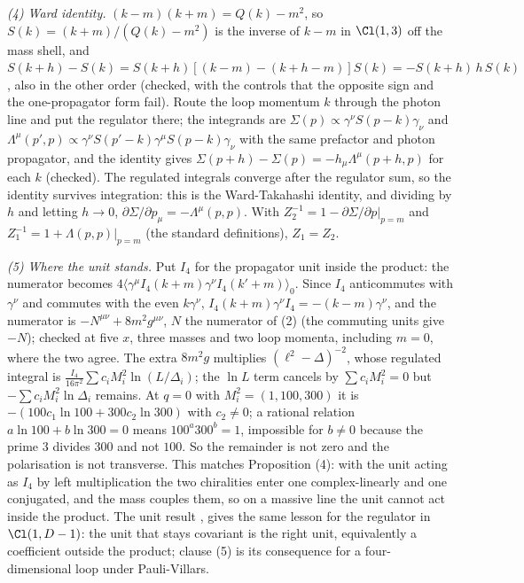 \emph{(4) Ward identity.} $(k - m)(k + m) = Q(k) - m^{2}$, so $S(k) = (k + m)/(Q(k) - m^{2})$ is the inverse of $k - m$ in $\Cl(1,3)$ off the mass shell, and $S(k+h) - S(k) = S(k+h)[(k - m) - (k + h - m)]S(k) = -S(k+h)\,h\,S(k)$, also in the other order (checked, with the controls that the opposite sign and the one-propagator form fail). Route the loop momentum $k$ through the photon line and put the regulator there; the integrands are $\Sigma(p) \propto \gamma^{\nu}S(p-k)\gamma_{\nu}$ and $\Lambda^{\mu}(p', p) \propto \gamma^{\nu}S(p'-k)\gamma^{\mu}S(p-k)\gamma_{\nu}$ with the same prefactor and photon propagator, and the identity gives $\Sigma(p+h) - \Sigma(p) = -h_{\mu}\Lambda^{\mu}(p+h, p)$ for each $k$ (checked). The regulated integrals converge after the regulator sum, so the identity survives integration: this is the Ward-Takahashi identity, and dividing by $h$ and letting $h \to 0$, $\partial\Sigma/\partial p_{\mu} = -\Lambda^{\mu}(p, p)$. With $Z_{2}^{-1} = 1 - \partial\Sigma/\partial p|_{p = m}$ and $Z_{1}^{-1} = 1 + \Lambda(p, p)|_{p = m}$ (the standard definitions), $Z_{1} = Z_{2}$.

\emph{(5) Where the unit stands.} Put $I_{4}$ for the propagator unit inside the product: the numerator becomes $4\langle\gamma^{\mu}I_{4}(k+m)\gamma^{\nu}I_{4}(k'+m)\rangle_{0}$. Since $I_{4}$ anticommutes with $\gamma^{\nu}$ and commutes with the even $k\gamma^{\nu}$, $I_{4}(k + m)\gamma^{\nu}I_{4} = -(k - m)\gamma^{\nu}$, and the numerator is $-N^{\mu\nu} + 8m^{2}g^{\mu\nu}$, $N$ the numerator of (2) (the commuting units give $-N$); checked at five $x$, three masses and two loop momenta, including $m = 0$, where the two agree. The extra $8m^{2}g$ multiplies $(\ell^{2} - \Delta)^{-2}$, whose regulated integral is $\frac{I_{4}}{16\pi^{2}}\sum c_{i}M_{i}^{2}\ln(L/\Delta_{i})$; the $\ln L$ term cancels by $\sum c_{i}M_{i}^{2} = 0$ but $-\sum c_{i}M_{i}^{2}\ln\Delta_{i}$ remains. At $q = 0$ with $M_{i}^{2} = (1, 100, 300)$ it is $-(100c_{1}\ln 100 + 300c_{2}\ln 300)$ with $c_{2} \neq 0$; a rational relation $a\ln100 + b\ln300 = 0$ means $100^{a}300^{b} = 1$, impossible for $b \neq 0$ because the prime $3$ divides $300$ and not $100$. So the remainder is not zero and the polarisation is not transverse. This matches Proposition (4): with the unit acting as $I_{4}$ by left multiplication the two chiralities enter one complex-linearly and one conjugated, and the mass couples them, so on a massive line the unit cannot act inside the product. The unit result , gives the same lesson for the regulator in $\Cl(1, D-1)$: the unit that stays covariant is the right unit, equivalently a coefficient outside the product; clause (5) is its consequence for a four-dimensional loop under Pauli-Villars.

